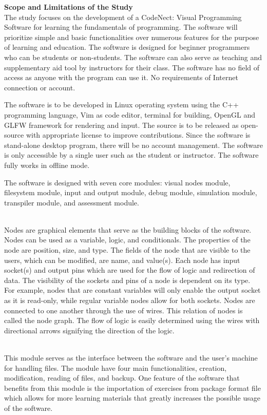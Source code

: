 \flushleft
\textbf{Scope and Limitations of the Study}\\
\justifying
\parx
The study focuses on the development of a CodeNect: Visual Programming Software
for learning the fundamentals of programming. The software will prioritize
simple and basic functionalities over numerous features for the purpose of
learning and education. The software is designed for beginner programmers who
can be students or non-students. The software can also serve as teaching and
supplementary aid tool by instructors for their class. The software has no
field of access as anyone with the program can use it. No requirements of
Internet connection or account.

The software is to be developed in Linux operating system using the C++ programming
language, Vim as code editor, terminal for building, OpenGL and GLFW framework for
rendering and input.
The source is to be released as open-source with appropriate license to improve
contributions. Since the software is stand-alone desktop program, there will be no
account management. The software is only accessible by a single user such as the
student or instructor.
The software fully works in offline mode.

The software is designed with seven core modules: visual nodes module,
filesystem module, input and output module, debug module, simulation module,
transpiler module, and assessment module.

\flushleft
\textbf{}\\
\justifying
\parx
Nodes are graphical elements that serve as the building blocks of the software.
Nodes can be used as a variable, logic, and conditionals. The properties of the node
are position, size, and type. The fields of the node that are visible to the
users, which can be modified, are name, and value(s). Each node has input
socket(s) and output pins which are used for the flow of logic and redirection
of data. The visibility of the sockets and pins of a node is dependent on its
type.  For example, nodes that are constant variables will only enable the
output socket as it is read-only, while regular variable nodes allow for both
sockets.  Nodes are connected to one another through the use of wires. This
relation of nodes is called the node graph. The flow of logic is easily
determined using the wires with directional arrows signifying the direction of
the logic.

\flushleft
\textbf{}\\
\justifying
\parx
This module serves as the interface between the software and the user's machine for
handling files. The module have four main functionalities, creation, modification,
reading of files, and backup. One feature of the software that benefits from this
module is the importation of exercises from package format file which allows for
more learning materials that greatly increases the possible usage of the software.

